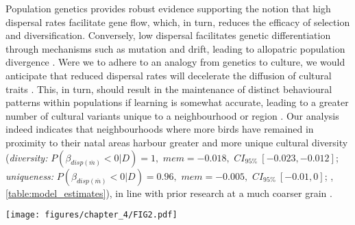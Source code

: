Population genetics provides robust evidence supporting the notion that high dispersal rates facilitate gene flow, which, in turn, reduces the efficacy of selection and diversification. Conversely, low dispersal facilitates genetic differentiation through mechanisms such as mutation and drift, leading to allopatric population divergence \parencite{suarez2022, claramunt2011, papadopoulou2009}. Were we to adhere to an analogy from genetics to culture, we would anticipate that reduced dispersal rates will decelerate the diffusion of cultural traits \parencite{nunn2009}. This, in turn, should result in the maintenance of distinct behavioural patterns within populations if learning is somewhat accurate, leading to a greater number of cultural variants unique to a neighbourhood or region \parencite{whitehead2012, planque2014}. Our analysis indeed indicates that neighbourhoods where more birds have remained in proximity to their natal areas harbour greater and more unique cultural diversity (\textit{diversity:} $P(\beta_{disp (\overline{m})} < 0 | D) = 1,$ $mem = -0.018,$ $CI_{95\%}~[-0.023, -0.012]$; \textit{uniqueness:} $P(\beta_{disp (\overline{m})} < 0 | D) = 0.96,$ $mem = -0.005,$ $CI_{95\%}~[-0.01, 0]$; , \autoref{table:model_estimates}), in line with prior research at a much coarser grain \parencite{fayet2014}. 

\begin{figure*}[ht!]
    \centering
    \texttt{[image: figures/chapter\_4/FIG2.pdf]}
    \label{c4_fig:individual}
\end{figure*}

